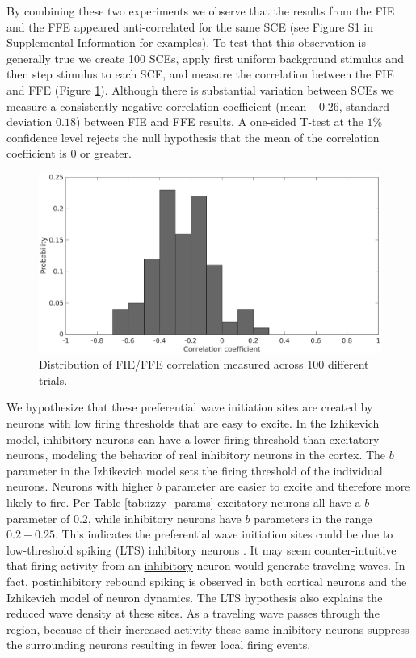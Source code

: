 \documentclass[12pt]{article}
\begin{document}
By combining these two experiments we observe that the results from the FIE and the FFE appeared anti-correlated for the same SCE (see Figure S1 in Supplemental Information for examples).
To test that this observation is generally true we create 100 SCEs, apply first uniform background stimulus and then step stimulus to each SCE, and measure the correlation between the FIE and FFE (Figure \ref{fig:InitiationCorrelation}).
Although there is substantial variation between SCEs we measure a consistently negative correlation coefficient (mean $-0.26$, standard deviation $0.18$) between FIE and FFE results.
\color{red}A one-sided T-test at the $1\%$ confidence level rejects the null hypothesis that the mean of the correlation coefficient is $0$ or greater\color{black}.
\begin{figure}[!htb]
 \centering
 \caption{\color{red}Distribution of FIE/FFE correlation measured across\color{black} 100 different trials. }
 \label{fig:InitiationCorrelation}
 \includegraphics[width=\textwidth]{fig/InitiationCorrelationPDF}
\end{figure}

We hypothesize that these preferential wave initiation sites are created by neurons with low firing thresholds that are easy to excite.
In the Izhikevich model, inhibitory neurons can have a lower firing threshold than excitatory neurons, modeling the behavior of real inhibitory neurons in the cortex\parencite{gibson2009}\parencite{hayut2011}.
The $b$ parameter in the Izhikevich model sets the firing threshold of the individual neurons.
Neurons with higher $b$ parameter are easier to excite and therefore more likely to fire.
Per Table \ref{tab:izzy_params} excitatory neurons all have a $b$ parameter of $0.2$, while inhibitory neurons have $b$ parameters in the range $0.2-0.25$.
This indicates the preferential wave initiation sites could be due to low-threshold spiking (LTS) inhibitory neurons \parencite{izhikevich2003}.
It may seem counter-intuitive that firing activity from an \underline{inhibitory} neuron would generate traveling waves.
In fact, postinhibitory rebound spiking is observed in both cortical neurons \parencite{ascoli2010} and the Izhikevich model of neuron dynamics.
The LTS hypothesis also explains the reduced wave density at these sites.
As a traveling wave passes through the region, because of their increased activity these same inhibitory neurons suppress the surrounding neurons resulting in fewer local firing events.
\end{document}
